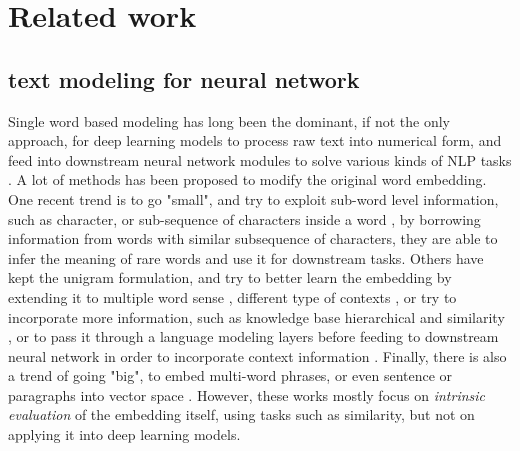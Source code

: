 

\section{Related work}
\subsection{text modeling for neural network}
Single word based modeling has long been the dominant, if not the only approach, for deep learning models to process raw text into numerical form, and feed into downstream neural network modules to solve various kinds of NLP tasks  \cite{collobert2011natural, wu2016google, conneau2017very, severyn2015learning}.
A lot of methods has been proposed to modify the original word embedding. One recent trend is to go "small", and try to exploit sub-word level information, such as character, or sub-sequence of characters inside a word \cite{wieting2016charagram, bojanowski2016enriching, pinter2017mimicking}, by borrowing information from words with similar subsequence of characters, they are able to infer the meaning of rare words and use it for downstream tasks. 
Others have kept the unigram formulation, and try to better learn the embedding by extending it to multiple word sense \cite{neelakantan2015efficient, athiwaratkun2017multimodal}, 
different type of contexts \cite{levy2014dependency, melamud2016role}, 
or try to incorporate more information, such as knowledge base hierarchical and similarity \cite{nickel2017poincare, faruqui2014retrofitting}, 
or to pass it through a language modeling layers before feeding to downstream neural network in order to incorporate context information \cite{mccann2017learned, peters2018deep}.
Finally, there is also a trend of going "big", to embed multi-word phrases, or even sentence or paragraphs into vector space \cite{mikolov2013distributed, hill2015learning, arora2016simple} . 
However, these works mostly focus on \emph{intrinsic evaluation} of the embedding itself, using tasks such as similarity, but not on applying it into deep learning models.

